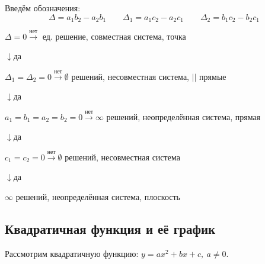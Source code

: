 \documentclass{article}
\begin{document}
    Введём обозначения:
    \[\Delta = a_1b_2 - a_2b_1\qquad \Delta_1 = a_1c_2 - a_2c_1\qquad \Delta_2 = b_1c_2 - b_2c_1\]

    \(\Delta = 0 \overset{\textrm{нет}}{\longrightarrow}\) ед. решение, совместная система, точка

    \(\downarrow\)да

    \(\Delta_1 = \Delta_2 = 0 \overset{\textrm{нет}}{\longrightarrow} \emptyset\) решений, несовместная система, \(||\) прямые

    \(\downarrow\)да

    \(a_1 = b_1 = a_2 = b_2 = 0 \overset{\textrm{нет}}{\longrightarrow} \infty\) решений, неопределённая система, прямая

    \(\downarrow\)да

    \(c_1 = c_2 = 0 \overset{\textrm{нет}}{\longrightarrow} \emptyset\) решений, несовместная система

    \(\downarrow\)да

    \(\infty\) решений, неопределённая система, плоскость

    \subsection{Квадратичная функция и её график}

    Рассмотрим квадратичную функцию: \(y = ax^2+bx+c,\ a \not = 0\).
\end{document}
